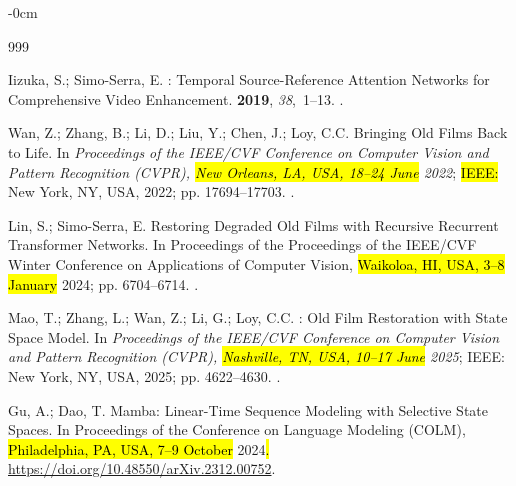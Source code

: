 \documentclass[symmetry,article,accept,pdftex,moreauthors]{Definitions/mdpi}
\begin{document}
\begin{adjustwidth}{-\extralength}{0cm}
%
\begin{thebibliography}{999}

Iizuka, S.; Simo-Serra, E.
: Temporal Source-Reference Attention Networks for
  Comprehensive Video Enhancement.
 {\bf 2019}, {\em 38},~1--13.
.

Wan, Z.; Zhang, B.; Li, D.; Liu, Y.; Chen, J.; Loy, C.C.
\newblock Bringing Old Films Back to Life.
\newblock In \emph{Proceedings of the IEEE/CVF Conference on Computer Vision and
  Pattern Recognition (CVPR), \hl{New Orleans, LA, USA, 18--24 June} %
  2022}; \hl{IEEE:} %
 New York, NY, USA, 2022; \linebreak  pp. 17694--17703.
.

Lin, S.; Simo-Serra, E.
\newblock Restoring Degraded Old Films with Recursive Recurrent Transformer
  Networks.
\newblock In Proceedings of the Proceedings of the IEEE/CVF Winter Conference
  on Applications of Computer Vision, \hl{Waikoloa, HI, USA, 3--8 January} 2024; \linebreak  pp. 6704--6714.
.

Mao, T.; Zhang, L.; Wan, Z.; Li, G.; Loy, C.C.
: Old Film Restoration with State Space Model.
\newblock In \emph{Proceedings of the IEEE/CVF Conference on Computer Vision and
  Pattern Recognition (CVPR), \hl{Nashville, TN, USA, 10--17 June} 2025}; IEEE: New York, NY, USA, 2025; pp. 4622--4630.
.

Gu, A.; Dao, T.
\newblock Mamba: Linear-Time Sequence Modeling with Selective State Spaces.
\newblock In Proceedings of the Conference on Language Modeling (COLM), \hl{Philadelphia, PA, USA, 7--9 October}  2024\hl{.} %
  \url{ 	
https://doi.org/10.48550/arXiv.2312.00752}.


\end{thebibliography}
\end{adjustwidth}
\end{document}
